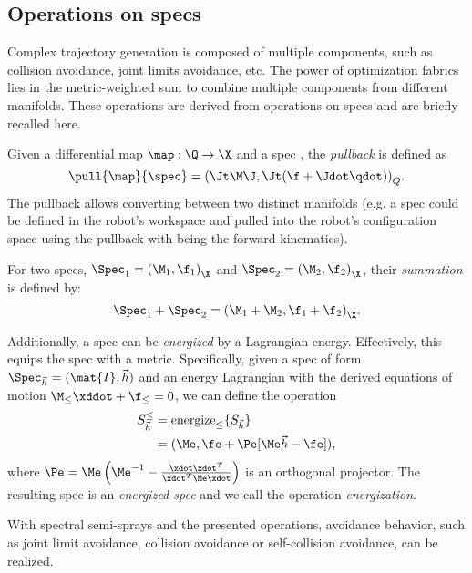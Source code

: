 \subsection{Operations on specs}%
\label{sub:operations_on_specs}
%
%
Complex trajectory generation is composed of multiple components, such as collision avoidance, joint limits
avoidance, etc. The power of optimization fabrics lies in the metric-weighted sum to
combine multiple components from different manifolds.
These operations are derived from operations on specs and are briefly recalled here.

Given a differential map $\map: \Q\rightarrow\X$ and a spec \spec{}, the \textit{pullback}
is defined as 
\begin{equation}
  \pull{\map}{\spec} = {\left(\Jt\M\J, \Jt(\f+\Jdot\qdot)\right)}_{Q}.
\end{equation}
The pullback allows converting between two distinct manifolds (e.g. a spec could be 
defined in the robot's workspace and pulled into the robot's configuration space using
the pullback with \map{} being the forward kinematics).

For two specs, $\Spec_1 = {\left(\M_1,\f_1\right)}_{\X}$ and 
$\Spec_2 = {\left(\M_2,\f_2\right)}_{\X}$, their \textit{summation} is defined by:
\begin{equation}
  \Spec_1 + \Spec_2 = {\left(\M_1 + \M_2, \f_1 + \f_2\right)}_{\X}.
  \label{eq:specs_summation}
\end{equation}
%

Additionally, a spec can be \textit{energized} by a Lagrangian energy. Effectively, 
this equips the spec with a metric.
Specifically, given a spec of form $\Spec_{\vec{h}} = (\mat{I},\vec{h})$ and 
an energy Lagrangian \le{} with the derived equations of motion $\M_{\le}\xddot + \f_{\le} =0$, 
we can define the operation
\begin{equation}
  \begin{split}
  S_{\vec{h}}^{\le} &= \text{energize}_{\le}\{S_{\vec{h}}\} \\
    &= (\Me, \fe + \Pe[\Me\vec{h} - \fe]), 
  \end{split}
  \label{eq:energization}
\end{equation}
where $\Pe = \Me\left(\Me^{-1} - \frac{\xdot\xdot^T}{\xdot^T\Me\xdot}\right)$ is an
orthogonal projector. The resulting spec is an \textit{energized spec} and 
we call the operation \textit{energization}.

With spectral semi-sprays and the presented operations,
avoidance behavior, such as joint limit avoidance, collision
avoidance or self-collision avoidance, can be realized.

